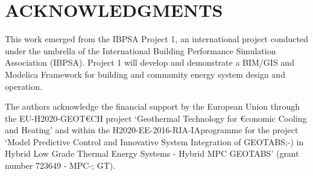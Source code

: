 \documentclass[10pt]{extarticle}
\begin{document}


\vspace{24pt}


\section*{ACKNOWLEDGMENTS}

This work emerged from the IBPSA Project 1, an international project conducted under the umbrella of the International Building Performance Simulation Association (IBPSA). Project 1 will develop and demonstrate a BIM/GIS and Modelica Framework for building and community energy system design and operation.

The authors acknowledge the financial support by the European Union through  the EU-H2020-GEOT\euro CH 
project ‘Geothermal Technology for \euro conomic Cooling and Heating’ 
and within the H2020-EE-2016-RIA-IAprogramme for the project ‘Model Predictive Control and Innovative System Integration of GEOTABS;-) 
in Hybrid Low Grade Thermal Energy Systems - Hybrid MPC GEOTABS’ (grant number 723649 - MPC-; GT). 
\end{document}
